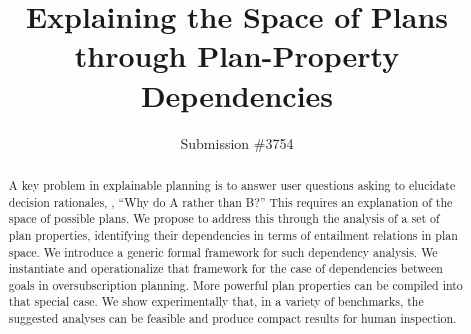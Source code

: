 \documentclass{article}
\begin{document}
\title{Explaining the Space of Plans through Plan-Property Dependencies}

\author{Submission \#3754}

%

\maketitle

\begin{abstract}
A key problem in explainable planning is to answer user questions
asking to elucidate decision rationales, \eg, ``Why do A rather than
B?'' This requires an explanation of the space of possible plans. We
propose to address this through the analysis of a set of plan
properties, identifying their dependencies in terms of entailment
relations in plan space. We introduce a generic formal framework for
such dependency analysis. We instantiate and operationalize that
framework for the case of dependencies between goals in
oversubscription planning.
%
%
%
More powerful plan properties can be compiled into that special case.
%
We show experimentally that, in a variety of benchmarks, the suggested
analyses can be feasible and produce compact results for human
inspection.
\end{abstract}
\end{document}
